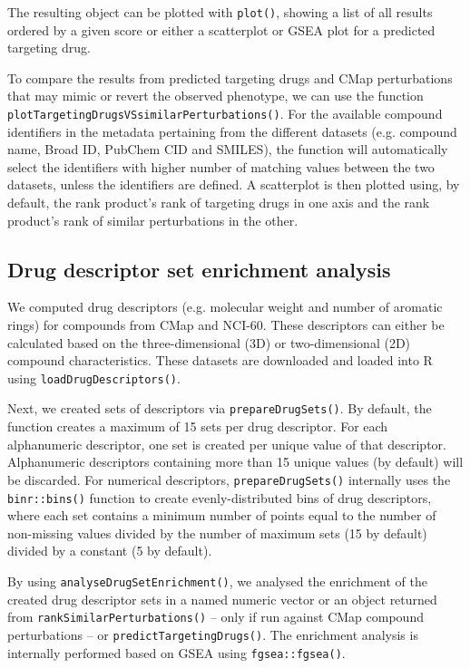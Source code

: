 The resulting object can be plotted with \texttt{plot()}, showing a list of all results ordered by a given score or either a scatterplot or GSEA plot for a predicted targeting drug.

To compare the results from predicted targeting drugs and CMap perturbations that may mimic or revert the observed phenotype, we can use the function \texttt{plotTargetingDrugsVSsimilarPerturbations()}. For the available compound identifiers in the metadata pertaining from the different datasets (e.g. compound name, Broad ID, PubChem CID and SMILES), the function will automatically select the identifiers with higher number of matching values between the two datasets, unless the identifiers are defined. A scatterplot is then plotted using, by default, the rank product’s rank of targeting drugs in one axis and the rank product’s rank of similar perturbations in the other.

\subsection{Drug descriptor set enrichment analysis}

We computed drug descriptors (e.g. molecular weight and number of aromatic rings) for compounds from CMap and NCI-60. These descriptors can either be calculated based on the three-dimensional (3D) or two-dimensional (2D) compound characteristics. These datasets are downloaded and loaded into R using \texttt{loadDrugDescriptors()}.

Next, we created sets of descriptors via \texttt{prepareDrugSets()}. By default, the function creates a maximum of 15 sets per drug descriptor. For each alphanumeric descriptor, one set is created per unique value of that descriptor. Alphanumeric descriptors containing more than 15 unique values (by default) will be discarded. For numerical descriptors, \texttt{prepareDrugSets()} internally uses the \texttt{binr::bins()} function to create evenly-distributed bins of drug descriptors, where each set contains a minimum number of points equal to the number of non-missing values divided by the number of maximum sets (15 by default) divided by a constant (5 by default).

By using \texttt{analyseDrugSetEnrichment()}, we analysed the enrichment of the created drug descriptor sets in a named numeric vector or an object returned from \texttt{rankSimilarPerturbations()} – only if run against CMap compound perturbations – or \texttt{predictTargetingDrugs()}. The enrichment analysis is internally performed based on GSEA using \texttt{fgsea::fgsea()}.

